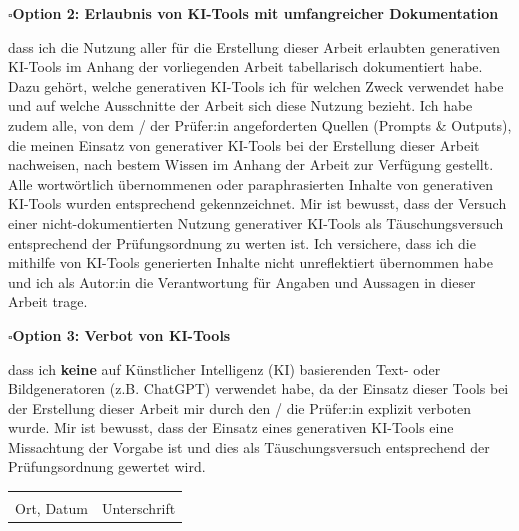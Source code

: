 \vspace{0.75\baselineskip}

\noindent
$\square$\hspace{1em}\textbf{Option 2: Erlaubnis von KI-Tools mit umfangreicher Dokumentation}

\smallskip

\noindent
dass ich die Nutzung aller für die Erstellung dieser Arbeit erlaubten generativen KI-Tools im Anhang der vorliegenden Arbeit tabellarisch dokumentiert habe.
Dazu gehört, welche generativen KI-Tools ich für welchen Zweck verwendet habe und auf welche Ausschnitte der Arbeit sich diese Nutzung bezieht.
Ich habe zudem alle, von dem / der Prüfer:in angeforderten Quellen (Prompts \& Outputs), die meinen Einsatz von generativer KI-Tools bei der Erstellung dieser Arbeit nachweisen, nach bestem Wissen im Anhang der Arbeit zur Verfügung gestellt.
Alle wortwörtlich übernommenen oder paraphrasierten Inhalte von generativen KI-Tools wurden entsprechend gekennzeichnet.
Mir ist bewusst, dass der Versuch einer nicht-dokumentierten Nutzung generativer KI-Tools als Täuschungsversuch entsprechend der Prüfungsordnung zu werten ist.
Ich versichere, dass ich die mithilfe von KI-Tools generierten Inhalte nicht unreflektiert übernommen habe und ich als Autor:in die Verantwortung für Angaben und Aussagen in dieser Arbeit trage.

\vspace{0.75\baselineskip}

\noindent
$\square$\hspace{1em}\textbf{Option 3: Verbot von KI-Tools}

\smallskip

\noindent
dass ich \textbf{keine} auf Künstlicher Intelligenz (KI) basierenden Text- oder Bildgeneratoren (z.B. ChatGPT) verwendet habe, da der Einsatz dieser Tools bei der Erstellung dieser Arbeit mir durch den / die Prüfer:in explizit verboten wurde. Mir ist bewusst, dass der Einsatz eines generativen KI-Tools eine Missachtung der Vorgabe ist und dies als Täuschungsversuch entsprechend der Prüfungsordnung gewertet wird.

\vspace{1.5\baselineskip}

\noindent
\begin{tabularx}{\textwidth}{@{}X X@{}}
	\underline{\hspace{0.85\linewidth}} &
	\underline{\hspace{0.85\linewidth}}                \\
	Ort, Datum                          & Unterschrift
\end{tabularx}

\normalsize

\clearpage
